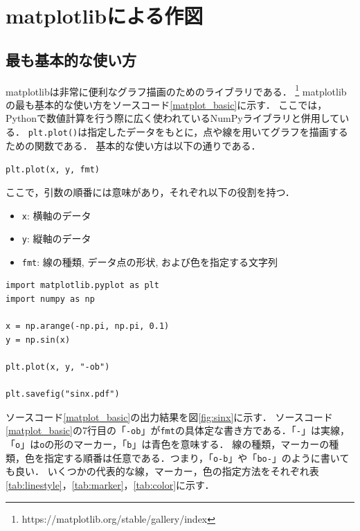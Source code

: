 \documentclass[a4paper,12pt]{jsarticle}
\begin{document}


\section{matplotlibによる作図}

\subsection{最も基本的な使い方}

matplotlibは非常に便利なグラフ描画のためのライブラリである．
\footnote{
https://matplotlib.org/stable/gallery/index
}
matplotlibの最も基本的な使い方をソースコード\ref{matplot_basic}に示す．
ここでは，Pythonで数値計算を行う際に広く使われているNumPyライブラリと併用している．
\texttt{plt.plot()}は指定したデータをもとに，点や線を用いてグラフを描画するための関数である．
基本的な使い方は以下の通りである．

\begin{center}
\texttt{plt.plot(x, y, fmt)}
\end{center}

ここで，引数の順番には意味があり，それぞれ以下の役割を持つ．

\begin{itemize}
\item \texttt{x}: 横軸のデータ
\item \texttt{y}: 縦軸のデータ
\item \texttt{fmt}: 線の種類, データ点の形状,
および色を指定する文字列
\end{itemize}

\begin{lstlisting}[caption=matplotlibの最も基本的な使い方,label=matplot_basic]
import matplotlib.pyplot as plt
import numpy as np
 
x = np.arange(-np.pi, np.pi, 0.1)
y = np.sin(x)
 
plt.plot(x, y, "-ob")
 
plt.savefig("sinx.pdf")
\end{lstlisting}

ソースコード\ref{matplot_basic}の出力結果を図\ref{fig:sinx}に示す．
ソースコード\ref{matplot_basic}の7行目の「\texttt{-ob}」が\texttt{fmt}の具体定な書き方である．「\texttt{-}」は実線，「\texttt{o}」は\texttt{o}の形のマーカー，「\texttt{b}」は青色を意味する．
線の種類，マーカーの種類，色を指定する順番は任意である．つまり，「\texttt{o-b}」や「\texttt{bo-}」のように書いても良い．
いくつかの代表的な線，マーカー，色の指定方法をそれぞれ表\ref{tab:linestyle}，\ref{tab:marker}，\ref{tab:color}に示す．
\end{document}
